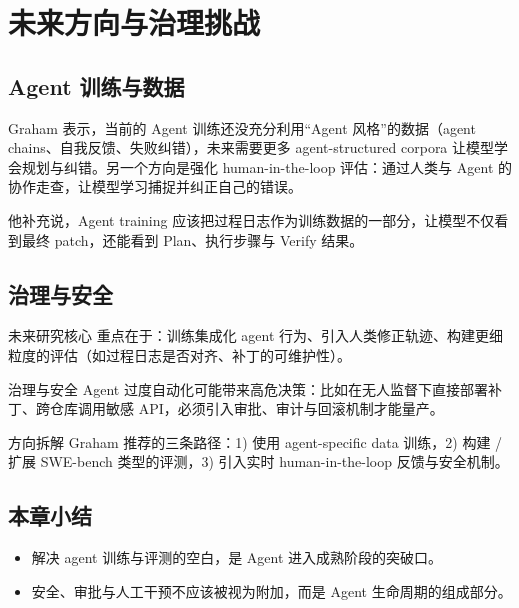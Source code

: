 \section{未来方向与治理挑战}
\subsection{Agent 训练与数据}
Graham 表示，当前的 Agent 训练还没充分利用“Agent 风格”的数据（agent chains、自我反馈、失败纠错），未来需要更多 agent-structured corpora 让模型学会规划与纠错。另一个方向是强化 human-in-the-loop 评估：通过人类与 Agent 的协作走查，让模型学习捕捉并纠正自己的错误。

他补充说，Agent training 应该把过程日志作为训练数据的一部分，让模型不仅看到最终 patch，还能看到 Plan、执行步骤与 Verify 结果。

\subsection{治理与安全}
\begin{knowledgebox}{未来研究核心}
重点在于：训练集成化 agent 行为、引入人类修正轨迹、构建更细粒度的评估（如过程日志是否对齐、补丁的可维护性）。
\end{knowledgebox}

\begin{warningbox}{治理与安全}
Agent 过度自动化可能带来高危决策：比如在无人监督下直接部署补丁、跨仓库调用敏感 API，必须引入审批、审计与回滚机制才能量产。
\end{warningbox}

\begin{importantbox}{方向拆解}
Graham 推荐的三条路径：1) 使用 agent-specific data 训练，2) 构建 / 扩展 SWE-bench 类型的评测，3) 引入实时 human-in-the-loop 反馈与安全机制。
\end{importantbox}

\subsection{本章小结}
\begin{itemize}
    \item 解决 agent 训练与评测的空白，是 Agent 进入成熟阶段的突破口。
    \item 安全、审批与人工干预不应该被视为附加，而是 Agent 生命周期的组成部分。
\end{itemize}

